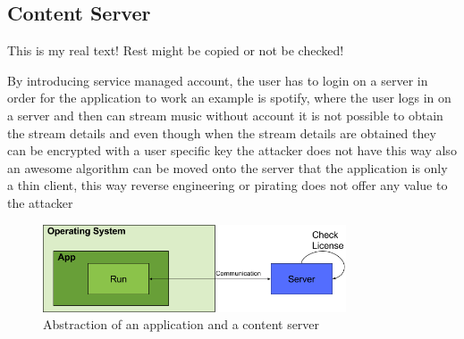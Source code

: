 \subsection{Content Server} \label{subsection:counter-replace-server}
This is my real text! Rest might be copied or not be checked!

By introducing service managed account, the user has to login on a server in order for the application to work
an example is spotify, where the user logs in on a server and then can stream music
without account it is not possible to obtain the stream details and even though when the stream details are obtained they can be encrypted with a user specific key the attacker does not have
this way also an awesome algorithm can be moved onto the server that the application is only a thin client, this way reverse engineering or pirating does not offer any value to the attacker


\begin{figure}[h]
    \centering
    \includegraphics[width=0.8\textwidth]{data/contentServer.png}
    \caption{Abstraction of an application and a content server}
    \label{fig:contentServer}
\end{figure}
